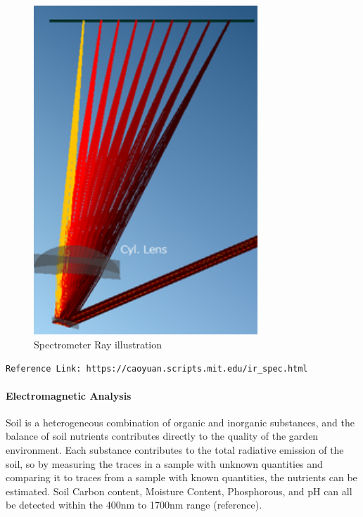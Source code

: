 \begin{figure}[H]
    \caption{Spectrometer Ray illustration}
    \centering
    \includegraphics[width=0.75\textwidth]{images/YuanCaoSpectrometer.png}
\end{figure}
\verb"Reference Link: https://caoyuan.scripts.mit.edu/ir_spec.html"

\paragraph{Electromagnetic Analysis} Soil is a heterogeneous combination of organic and inorganic substances, and the balance of soil nutrients contributes directly to the quality of the garden environment. Each substance contributes to the total radiative emission of the soil, so by measuring the traces in a sample with unknown quantities and comparing it to traces from a sample with known quantities, the nutrients can be estimated. Soil Carbon content, Moisture Content, Phosphorous, and pH can all be detected within the 400nm to 1700nm range (reference).

